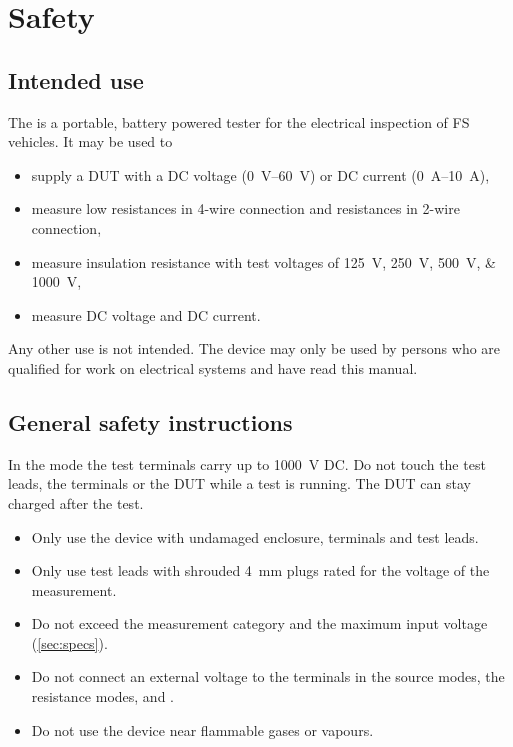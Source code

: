 \section{Safety}
\label{sec:safety}

\subsection{Intended use}
The \ST{} is a portable, battery powered tester for the electrical inspection of
\ac{FS} vehicles. It may be used to
\begin{itemize}
    \item supply a \ac{DUT} with a DC voltage (\qtyrange{0}{60}{\volt}) or DC current (\qtyrange{0}{10}{\ampere}),
    \item measure low resistances in 4-wire connection and resistances in 2-wire connection,
    \item measure insulation resistance with test voltages of \qtylist{125;250;500;1000}{\volt},
    \item measure DC voltage and DC current.
\end{itemize}
Any other use is not intended. The device may only be used by persons who are
qualified for work on electrical systems and have read this manual.

\subsection{General safety instructions}

\begin{danger}
    In the  mode the test terminals carry up to \qty{1000}{\volt} DC.
    Do not touch the test leads, the terminals or the \ac{DUT} while a test is running.
    The \ac{DUT} can stay charged after the test.
\end{danger}

\begin{warning}
    \begin{itemize}
        \item Only use the device with undamaged enclosure, terminals and test leads.
        \item Only use test leads with shrouded \qty{4}{\milli\meter} plugs rated for the voltage of the measurement.
        \item Do not exceed the measurement category and the maximum input voltage (\autoref{sec:specs}).
        \item Do not connect an external voltage to the terminals in the source modes, the
              resistance modes,  and .
        \item Do not use the device near flammable gases or vapours.
    \end{itemize}
\end{warning}

